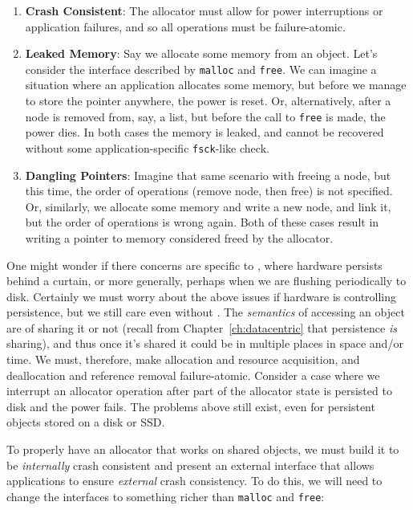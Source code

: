 \begin{enumerate}
    \item \textbf{Crash Consistent}: The allocator must allow for power interruptions or application failures, and so
          all operations must be failure-atomic.
    \item \textbf{Leaked Memory}: Say we allocate some memory from an object. Let's consider the interface described
          by \texttt{malloc} and \texttt{free}. We can imagine a situation where an application allocates some memory, but
          before we manage to store the pointer anywhere, the power is reset. Or, alternatively, after a node is removed from,
          say, a list, but before the call to \texttt{free} is made, the power dies. In both cases the memory is leaked, and
          cannot be recovered without some application-specific \texttt{fsck}-like check.
    \item \textbf{Dangling Pointers}: Imagine that same scenario with freeing a node, but this time, the order of operations
          (remove node, then free) is not specified. Or, similarly, we allocate some memory and write a new node, and link it, but the order of operations is
          wrong again. Both of these cases result in writing a pointer to memory considered freed by the allocator.
\end{enumerate}

One might wonder if there concerns are specific to \NVM, where hardware persists behind a curtain, or more generally,
perhaps when we are flushing periodically to disk. Certainly we must worry about the above issues if hardware is
controlling persistence, but we still care even without \NVM. The \emph{semantics} of accessing an object are of sharing
it or not (recall from Chapter~\ref{ch:datacentric} that persistence \emph{is} sharing), and thus once it's shared it
could be in multiple places in space and/or time. We must, therefore, make allocation and resource acquisition, and
deallocation and reference removal failure-atomic. Consider a case where we interrupt an allocator operation after part
of the allocator state is persisted to disk and the power fails. The problems above still exist, even for persistent
objects stored on a disk or SSD.

To properly have an allocator that works on shared objects, we must build it to be \emph{internally} crash consistent and
present an external interface that allows applications to ensure \emph{external} crash consistency.
To do this, we will
need to change the interfaces to something richer than \texttt{malloc} and \texttt{free}:

